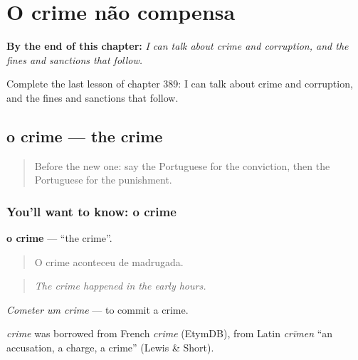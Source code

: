 
\chapter{O crime não compensa}
\label{ch:pt-o-crime-nao-compensa}

\begin{chapteropening}
\textbf{By the end of this chapter:} \emph{I can talk about crime and corruption, and the fines and sanctions that follow.}

Complete the last lesson of chapter 389: I can talk about crime and corruption, and the fines and sanctions that follow.
\end{chapteropening}

\section[o crime]{o crime — the crime}

\label{lesson:PT-C389-crime}



\begin{quote}
Before the new one: say the Portuguese for the conviction, then the Portuguese for the punishment.
\end{quote}

\subsection*{You'll want to know: o crime}
\textbf{o crime} — \textquotedblleft{}the crime\textquotedblright{}.

\begin{quote}
O crime aconteceu de madrugada.
\end{quote}

\begin{quote}
\emph{The crime happened in the early hours.}
\end{quote}

\emph{Cometer um crime} — to commit a crime.

\begin{cousinweb}
\emph{crime} was borrowed from French \emph{crime} (EtymDB), from Latin \emph{crīmen} \textquotedblleft{}an accusation, a charge, a crime\textquotedblright{} (Lewis \& Short).
\end{cousinweb}

